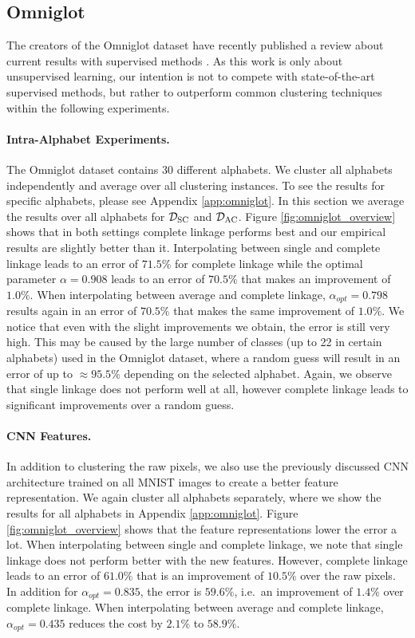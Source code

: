 \subsection{Omniglot}

The creators of the Omniglot dataset have recently published a review about current results with supervised methods \cite{DBLP:journals/corr/abs-1902-03477}. As this work is only about unsupervised learning, our intention is not to compete with state-of-the-art supervised methods, but rather to outperform common clustering techniques within the following experiments.

\paragraph{Intra-Alphabet Experiments.} The Omniglot dataset contains 30 different alphabets. We cluster all alphabets independently and average over all clustering instances. To see the results for specific alphabets, please see Appendix \ref{app:omniglot}. In this section we average the results over all alphabets for $\mathcal{D}_\text{SC}$ and $\mathcal{D}_\text{AC}$. Figure \ref{fig:omniglot_overview} shows that in both settings complete linkage performs best and our empirical results are slightly better than it. Interpolating between single and complete linkage leads to an error of $71.5\%$ for complete linkage while the optimal parameter $\alpha = 0.908$ leads to an error of $70.5\%$ that makes an improvement of $1.0\%$. When interpolating between average and complete linkage, $\alpha_{opt} = 0.798$ results again in an error of $70.5\%$ that makes the  same improvement of $1.0\%$. We notice that even with the slight improvements we obtain, the error is still very high. This may be caused by the large number of classes (up to 22 in certain alphabets) used in the Omniglot dataset, where a random guess will result in an error of up to $\approx 95.5\%$ depending on the selected alphabet. Again, we observe that single linkage does not perform well at all, however complete linkage leads to significant improvements over a random guess.

\paragraph{CNN Features.} In addition to clustering the raw pixels, we also use the previously discussed CNN architecture trained on all MNIST images to create a better feature representation. We again cluster all alphabets separately, where we show the results for all alphabets in Appendix \ref{app:omniglot}. Figure \ref{fig:omniglot_overview} shows that the feature representations lower the error a lot. When interpolating between single and complete linkage, we note that single linkage does not perform better with the new features. However, complete linkage leads to an error of $61.0\%$ that is an improvement of $10.5\%$ over the raw pixels. In addition for $\alpha_{opt} = 0.835$, the error is $59.6\%$, i.e.\ an improvement of $1.4\%$ over complete linkage. When interpolating between average and complete linkage, $\alpha_{opt} = 0.435$ reduces the cost by $2.1\%$ to $58.9\%$.

